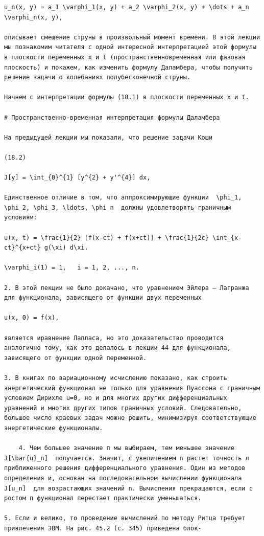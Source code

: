 \documentclass[
  ukrainian,
]{article}
\begin{document}
\begin{verbatim}
u_n(x, y) = a_1 \varphi_1(x, y) + a_2 \varphi_2(x, y) + \dots + a_n \varphi_n(x, y),

описывает смещение струны в произвольный момент времени. В этой лекции мы познакомим читателя с одной интересной интерпретацией этой формулы в плоскости переменных x и t (пространственновременная или фазовая плоскость) и покажем, как изменить формулу Даламбера, чтобы получить решение задачи о колебаниях полубесконечной струны.

Начнем с интерпретации формулы (18.1) в плоскости переменных x и t.

# Пространственно-временная интерпретация формулы Даламбера

На предыдущей лекции мы показали, что решение задачи Коши

(18.2)

J[y] = \int_{0}^{1} [y^{2} + y'^{4}] dx,

Единственное отличие в том, что аппроксимирующие функции  \phi_1, \phi_2, \phi_3, \ldots, \phi_n  должны удовлетворять граничным условиям:

u(x, t) = \frac{1}{2} [f(x-ct) + f(x+ct)] + \frac{1}{2c} \int_{x-ct}^{x+ct} g(\xi) d\xi.

\varphi_i(1) = 1,   i = 1, 2, ..., n.

2. В этой лекции не было докачано, что уравнением Эйлера — Лагранжа для функционала, зависящего от функции двух переменных

u(x, 0) = f(x),

является иравнение Лапласа, но это доказательство проводится аналогично тому, как это делалось в лекции 44 для функционала, зависящего от функции одной переменной.

3. В книгах по вариационному исчислению показано, как строить энергетический функционал не только для уравнения Пуассона с граничным условием Дирихле u=0, но и для многих других дифференциальных уравнений и многих других типов граничных условий. Следовательно, большое число краевых задач можно решить, минимизируя соответствующие энергетические функционалы.

    4. Чем большее значение п мы выбираем, тем меньшее значение  J[\bar{u}_n]  получается. Значит, с увеличением n растет точность л приближенного решения дифференциального уравнения. Один из методов определения и, основан на последовательном вычислении функционала  J[u_n]  для возрастающих значений n. Вычисления прекращаются, если с ростом п функционал перестает практически уменьшаться.

5. Если и велико, то проведение вычислений по методу Ритца требует привлечения ЭВМ. На рис. 45.2 (с. 345) приведена блок-


\end{verbatim}
\end{document}
